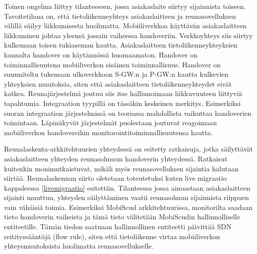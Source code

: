 Toinen ongelma liittyy tilanteeseen, jossa asiakaslaite siirtyy sijainnista toiseen. Tavoitetilana on, että tietoliikenneyhteys asiakaslaitteen ja reunasovelluksen välillä säilyy liikkumisesta huolimatta.
Mobiiliverkkoa käyttävän asiakaslaitteen liikkuminen johtaa yleensä jossain vaiheessa handoveriin.
Verkkoyhteys siis siirtyy kulkemaan toisen tukiaseman kautta. 
Asiakaslaitteen tietoliikenneyhteyksien kannalta handover on käytännössä huomaamaton.
Handover on toiminnallisuutena mobiiliverkon sisäinen toiminnallisuus.
Handover on suunniteltu tukemaan ulkoverkkoon S-GW:n ja P-GW:n kautta kulkevien yhteyksien muutoksia, siten että asiakaslaitteen tietoliikenneyhteydet eivät katkea.
Reunajärjestelmä joutuu siis itse hallinnoimaan liikkuvuuteen liittyviä tapahtumia.
Integraation tyypillä on tässäkin keskeinen merkitys.
Esimerkiksi suoran integraation järjestelmissä on teoriassa mahdollista vaikuttaa handoverien toimintaan.
Läpinäkyvät järjestelmät puolestaan joutuvat reagoimaan mobiiliverkon handovereihin monitorointitoiminnallisuutensa kautta.  

Reunalaskenta-arkkitehtuurien yhteydessä on esitetty ratkaisuja, jotka säilyttävät asiakaslaitteen yhteyden reunasolmuun handoverin yhteydessä. Ratkaisut kuitenkin monimutkaistuvat, mikäli myös reunasovelluksen sijaintia halutaan siirtää.
Reunalaskennan siirto oletetaan toteutetuksi kuten live migraatio kappaleessa \ref{livemigraatio} esitettiin.
Tilanteessa jossa ainoastaan asiakaslaitteen sijainti muuttuu, yhteyden säilyttäminen vaatii reunasolmun sijainnista riippuen vain vähäisiä toimia. 
Esimerkiksi MobiScud arkkitehtuurissa, monitorilta saadaan tieto handoverin vaiheista ja tämä tieto välitetään MobiScudin hallinnolliselle entiteetille.
Tämän tiedon saatuaan hallinnollinen entiteetti päivittää SDN reitityssääntöjä (flow rule), siten että tietoliikenne virtaa mobiiliverkon yhteysmuutoksista huolimatta reunasovellukselle.

